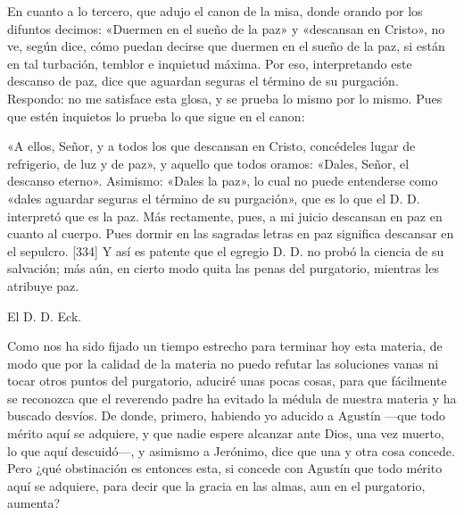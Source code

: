 En cuanto a lo tercero, que adujo el canon de la misa, donde orando por los difuntos decimos: «Duermen en el sueño de la paz» y «descansan en Cristo», no ve, según dice, cómo puedan decirse que duermen en el sueño de la paz, si están en tal turbación, temblor e inquietud máxima. Por eso, interpretando este descanso de paz, dice que aguardan seguras el término de su purgación. Respondo: no me satisface esta glosa, y se prueba lo mismo por lo mismo. Pues que estén inquietos lo prueba lo que sigue en el canon:

«A ellos, Señor, y a todos los que descansan en Cristo, concédeles lugar de refrigerio, de luz y de paz», y aquello que todos oramos: «Dales, Señor, el descanso eterno». Asimismo: «Dales la paz», lo cual no puede entenderse como «dales aguardar seguras el término de su purgación», que es lo que el D. D. interpretó que es la paz. Más rectamente, pues, a mi juicio descansan en paz en cuanto al cuerpo. Pues dormir en las sagradas letras en paz significa descansar en el sepulcro. [334] Y así es patente que el egregio D. D. no probó la ciencia de su salvación; más aún, en cierto modo quita las penas del purgatorio, mientras les atribuye paz.

El D. D. Eck.

Como nos ha sido fijado un tiempo estrecho para terminar hoy esta materia, de modo que por la calidad de la materia no puedo refutar las soluciones vanas ni tocar otros puntos del purgatorio, aduciré unas pocas cosas, para que fácilmente se reconozca que el reverendo padre ha evitado la médula de nuestra materia y ha buscado desvíos. De donde, primero, habiendo yo aducido a Agustín —que todo mérito aquí se adquiere, y que nadie espere alcanzar ante Dios, una vez muerto, lo que aquí descuidó—, y asimismo a Jerónimo, dice que una y otra cosa concede. Pero ¿qué obstinación es entonces esta, si concede con Agustín que todo mérito aquí se adquiere, para decir que la gracia en las almas, aun en el purgatorio, aumenta?

